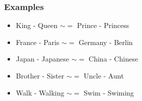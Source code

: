 \documentclass[compress, aspectratio=54]{beamer}
\begin{document}
\begin{frame}
\frametitle{Examples}
\begin{itemize}
\item King - Queen $\sim =$ Prince - Princess
\item France - Paris $\sim =$  Germany - Berlin
\item Japan - Japanese $\sim =$  China - Chinese
\item Brother - Sister $\sim = $ Uncle - Aunt
\item Walk - Walking $\sim =$  Swim - Swiming
\end{itemize}

\end{frame}
\end{document}
